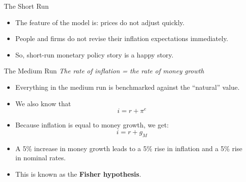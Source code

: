 \documentclass[shownotes,11pt, aspectratio=169]{beamer}
\begin{document}
\begin{frame}{The Short Run}
\begin{itemize}
\item The feature of the model is: \pause \textcolor{ao(english)}{prices do not adjust quickly}.
\item People and firms do not revise their inflation expectations immediately.
\item So, short-run monetary policy story is a happy story.
\end{itemize}
\end{frame}

\begin{frame}{The Medium Run}
\textit{The rate of inflation = the rate of money growth}
\begin{itemize}
\item Everything in the medium run is benchmarked against the ``natural'' value.
\pause
\item We also know that 
      \[ i = r + \pi^e \]
\item Because inflation is equal to money growth, we get:
     \[ i = r + g_M \]
\pause
\item A 5\% increase in money growth leads to a 5\% rise in inflation and a 5\% rise in nominal rates.
\item This is known as the \textbf{Fisher hypothesis}.
\end{itemize}
\end{frame}
\end{document}
